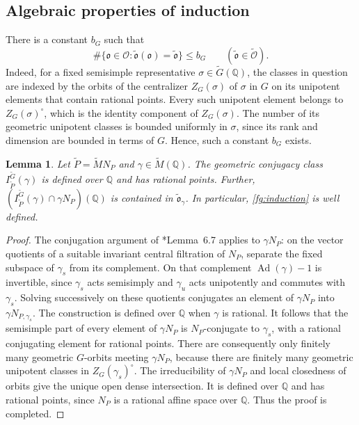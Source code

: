 \documentclass[12pt]{amsart}
\theoremstyle{definition}
\theoremstyle{plain}
\newtheorem{lemma}[definition]{Lemma}
\theoremstyle{remark}
\def\Q{\mathbb{Q}}%
\DeclareMathOperator{\Ad}{Ad}%
\newcommand{\fo}{\mathfrak{o}}
\newcommand{\cO}{\mathcal{O}}
\numberwithin{equation}{section}
\newcommand{\tG}{\widetilde{G}}
\newcommand{\tM}{\widetilde{M}}
\newcommand{\tP}{\widetilde{P}}
\newcommand{\tfo}{\widetilde{\mathfrak{o}}}
\newcommand{\tcO}{\widetilde{\mathcal{O}}}
\begin{document}
\subsection{Algebraic properties of induction}

There is a constant $b_G$ such that
\begin{equation}\label{fg:finite-refinement}
 \#\{\fo\in\cO:\tfo(\fo)=\tfo\}\le b_G
 \qquad(\tfo\in\tcO).
\end{equation}
Indeed, for a fixed semisimple representative $\sigma\in\tG(\Q)$, the
classes in question are indexed by the orbits of the
centralizer $Z_G(\sigma)$ of $\sigma$ in $G$ on its unipotent elements that
contain rational points.
Every such unipotent element belongs to $Z_G(\sigma)^\circ$, which is the identity component of $Z_G(\sigma)$.
The number of its geometric unipotent classes is bounded
uniformly in $\sigma$, since its rank and dimension are bounded
in terms of $G$.
Hence, such a constant $b_G$ exists. 

\begin{lemma}\label{lem:well defined}
Let $\tP=\tM N_P$ and $\gamma\in\tM(\Q)$. 
The geometric conjugacy class $I_{\tP}^{\tG}(\gamma)$ is defined over $\Q$ and has rational points. 
Further, $(I_{\tP}^{\tG}(\gamma)\cap \gamma N_P)(\Q)$ is contained in $\tfo_\gamma$. 
In particular, \eqref{fg:induction} is well defined.  
\end{lemma}
\begin{proof}
The conjugation argument of \cite{FL16}*{Lemma~6.7} applies to
$\gamma N_P$: on the vector quotients of a suitable invariant
central filtration of $N_P$, separate the fixed subspace of
$\gamma_s$ from its complement.
On that complement $\Ad(\gamma)-1$ is invertible, since
$\gamma_s$ acts semisimply and $\gamma_u$ acts unipotently
and commutes with $\gamma_s$.
Solving successively on these quotients conjugates an element
of $\gamma N_P$ into $\gamma N_{P,\gamma_s}$.
The construction is defined over $\Q$ when $\gamma$ is rational.
It follows that the semisimple part of every element of
$\gamma N_P$ is $N_P$-conjugate to $\gamma_s$, with a rational
conjugating element for rational points.
There are consequently only finitely many geometric $G$-orbits
meeting $\gamma N_P$, because there are finitely many
geometric unipotent classes in $Z_G(\gamma_s)^\circ$.
The irreducibility of $\gamma N_P$ and local closedness of
orbits give the unique open dense intersection.
It is defined over $\Q$ and has rational points, since
$N_P$ is a rational affine space over $\Q$.
Thus the proof is completed.        
\end{proof}
\end{document}
